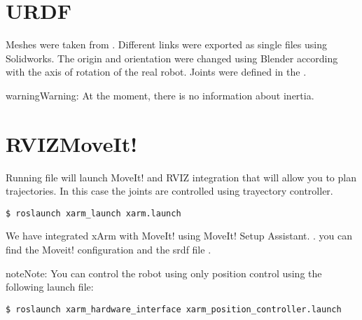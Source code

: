 \documentclass[letterpaper,10pt,english]{sphinxmanual}
\begin{document}
\section{URDF}
\label{\detokenize{user_guide/1_2_software_description:urdf}}
\sphinxAtStartPar
Meshes were taken from  . Different links were exported as single files using Solidworks. The origin and orientation were changed using Blender according with the axis of rotation of the real robot. Joints were defined in the .

\begin{sphinxadmonition}{warning}{Warning:}
\sphinxAtStartPar
At the moment, there is no information about inertia.
\end{sphinxadmonition}


\section{RVIZ\sphinxhyphen{}MoveIt!}
\label{\detokenize{user_guide/1_2_software_description:rviz-moveit}}
\sphinxAtStartPar
Running  file will launch MoveIt! and RVIZ integration that will allow you to plan trajectories. In this case the joints are controlled using trayectory controller.



\begin{Verbatim}[commandchars=\\\{\}]
$ roslaunch xarm_launch xarm.launch
\end{Verbatim}

\begin{figure}[htbp]
\centering

\noindent{}
\end{figure}

\sphinxAtStartPar
We have integrated xArm with MoveIt! using MoveIt! Setup Assistant. . you can find the Moveit! configuration and the srdf file  .

\begin{sphinxadmonition}{note}{Note:}
\sphinxAtStartPar
You can control the robot using only position control using the following launch file:



\begin{Verbatim}[commandchars=\\\{\}]
$ roslaunch xarm_hardware_interface xarm_position_controller.launch
\end{Verbatim}
\end{sphinxadmonition}



\renewcommand{\indexname}{Index}
\printindex
\end{document}
